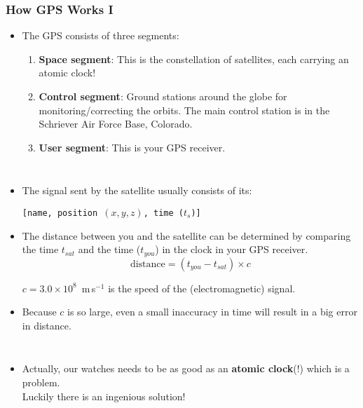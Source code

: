 \begin{frame}
\frametitle{How GPS Works I}
\begin{itemize}
\item The GPS consists of three segments:
\begin{enumerate}
\item \textbf{Space segment}: This is the constellation of satellites, each carrying an atomic clock!
\item \textbf{Control segment}: Ground stations around the globe for monitoring/correcting the orbits.
The main control station is in the Schriever Air Force Base, Colorado.
\item \textbf{User segment}: This is your GPS receiver.
\end{enumerate}
\end{itemize}
%
\begin{columns}
\begin{itemize}
\item The signal sent by the satellite usually consists of its: \centerline{\color{myGreen}\texttt{[name, position $(x,y,z)$, time ($t_s$)]}}
\item The distance between you and the satellite can be determined by comparing the time $t_{sat}$ and the time ($t_{you}$) in the clock in your GPS receiver.
\begin{equation}
\text{distance} = (t_{you} -t_{sat})\times c
\end{equation}
\begin{center}
	  $c=3.0\times10^8$~m\,s$^{-1}$ is the speed of the (electromagnetic) signal.
\end{center}
\item Because $c$ is so large, even a small inaccuracy in time will result in a big error in distance.
\end{itemize}
\end{columns}
\begin{itemize}
\item Actually, our watches needs to be as good as an \textbf{atomic clock}(!) which is a problem. \\Luckily there is an ingenious solution!
\end{itemize}

\end{frame}

